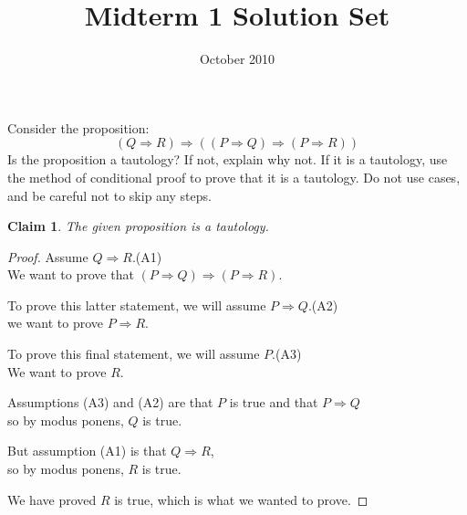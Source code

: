 \documentclass[12pt]{midterm}
\title{Midterm 1 Solution Set}
\date{October 2010}
\newtheorem*{claim}{Claim}
\begin{document}
\begin{exam}

\begin{problem}[360]
  Consider the proposition:
  $$
  \left(Q \Rightarrow R\right) \Rightarrow \left( (P \Rightarrow Q) \Rightarrow (P \Rightarrow R) \right)
  $$
  Is the proposition a tautology?  If not, explain why not.  If it is
  a tautology, use the method of conditional proof to prove that it is
  a tautology.  Do not use cases, and be careful not to skip any
  steps.
\end{problem}

\begin{solution}\begin{solutiontext}

\begin{claim}
  The given proposition is a tautology.
\end{claim}
\begin{proof}

Assume $Q \Rightarrow R$.\hfill (A1) \\
We want to prove that $(P \Rightarrow Q) \Rightarrow (P \Rightarrow R)$.

\vspace{1ex}%
\noindent%
\setlength{\leftskip}{0.5in}%
To prove this latter statement, we will assume $P \Rightarrow Q$.\hfill (A2) \\
we want to prove $P \Rightarrow R$.

\vspace{1ex}%
\noindent%
\setlength{\leftskip}{1in}%
To prove this final statement, we will assume $P$.\hfill (A3) \\
We want to prove $R$.

\vspace{1ex}%
\noindent%
Assumptions (A3) and (A2) are that $P$ is true and that $P \Rightarrow Q$\\
so by modus ponens, $Q$ is true.

\vspace{1ex}%
\noindent%
But assumption (A1) is that $Q \Rightarrow R$, \\
so by modus ponens, $R$ is true.

\vspace{1ex}%
\noindent%
We have proved $R$ is true, which is what we wanted to prove.
\end{proof}

\color{magenta!50!black}
\vfill
\setlength{\leftskip}{0in}

\end{solutiontext}
\end{solution}
\end{exam}
\end{document}
